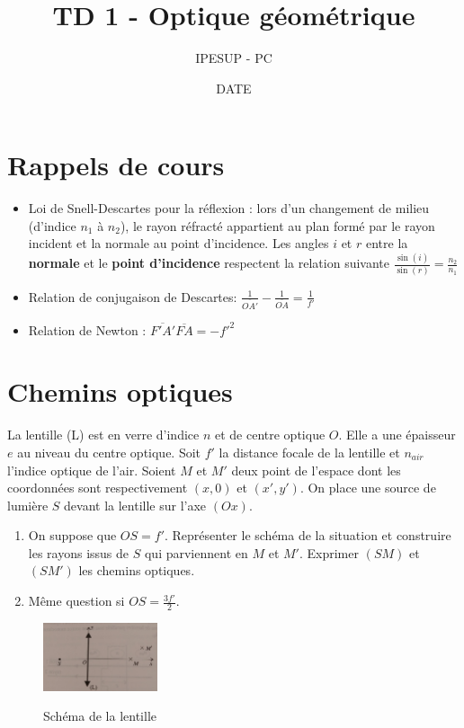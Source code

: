 \documentclass{article}
\title{TD 1 - Optique géométrique }
\author{IPESUP - PC }
\date{DATE }
\begin{document}
\maketitle



\section{Rappels de cours}

\begin{itemize}
  \item Loi de Snell-Descartes pour la réflexion : lors d'un changement de milieu (d'indice $n_1$ à $n_2$), le rayon réfracté appartient au plan formé par le rayon incident et la normale au point d'incidence. Les angles $i$ et $r$ entre la \textbf{normale} et le \textbf{point d'incidence} respectent la relation suivante $\frac{\sin(i)}{\sin(r)} = \frac{n_2}{n_1}$
  \item Relation de conjugaison de Descartes: $\frac{1}{\overline{OA'} } - \frac{1}{\overline{OA} } = \frac{1}{f'}$
  \item Relation de Newton : $\overline{F'A'} \overline{FA} = -f'^2$
\end{itemize}
\section{Chemins optiques}

La lentille (L) est en verre d'indice $n$ et de centre optique $O$.
Elle a une épaisseur $e$ au niveau du centre optique. 
Soit $f'$ la distance focale de la lentille et $n_{air}$ l'indice optique de l'air.
Soient $M$ et $M'$ deux point de l'espace dont les coordonnées sont respectivement $(x,0)$ et $(x',y')$.
On place une source de lumière $S$ devant la lentille sur l'axe $(Ox)$. 
\begin{enumerate}
  \item On suppose que $OS=f'$. Représenter le schéma de la situation et construire les rayons issus de $S$ qui parviennent en $M$ et $M'$. Exprimer $(SM)$ et $(SM')$ les chemins optiques. 
  \item Même question si $OS=\frac{3f'}{2}$.
\end{enumerate}




\begin{figure}[h]
  \centering
  \includegraphics[width=0.3\textwidth]{exercice 1.jpg}
  \label{fig:ex}
    \caption{Schéma de la lentille}
\end{figure}
\end{document}
